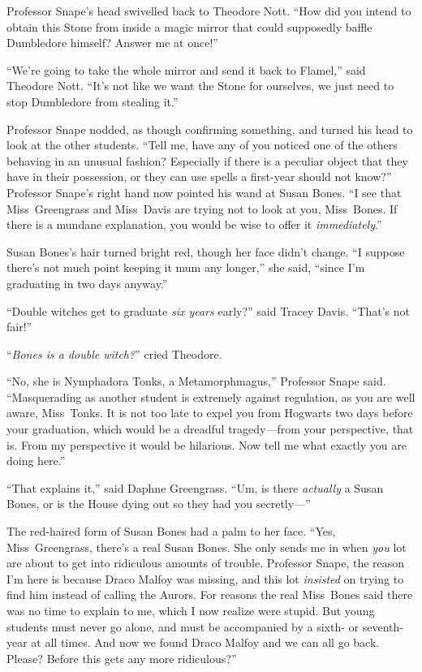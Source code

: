 Professor Snape’s head swivelled back to Theodore Nott. “How did you intend to obtain this Stone from inside a magic mirror that could supposedly baffle Dumbledore himself? Answer me at once!”

“We’re going to take the whole mirror and send it back to Flamel,” said Theodore Nott. “It’s not like we want the Stone for ourselves, we just need to stop Dumbledore from stealing it.”

Professor Snape nodded, as though confirming something, and turned his head to look at the other students. “Tell me, have any of you noticed one of the others behaving in an unusual fashion? Especially if there is a peculiar object that they have in their possession, or they can use spells a first-year should not know?” Professor Snape’s right hand now pointed his wand at Susan Bones. “I see that Miss~Greengrass and Miss~Davis are trying not to look at you, Miss~Bones. If there is a mundane explanation, you would be wise to offer it \emph{immediately}.”

Susan Bones’s hair turned bright red, though her face didn’t change. “I suppose there’s not much point keeping it mum any longer,” she said, “since I’m graduating in two days anyway.”

“Double witches get to graduate \emph{six years} early?” said Tracey Davis. “That’s not fair!”

“\emph{Bones is a double witch?}” cried Theodore.

“No, she is Nymphadora Tonks, a Metamorphmagus,” Professor Snape said. “Masquerading as another student is extremely against regulation, as you are well aware, Miss~Tonks. It is not too late to expel you from Hogwarts two days before your graduation, which would be a dreadful tragedy—from your perspective, that is. From my perspective it would be hilarious. Now tell me what exactly you are doing here.”

“That explains it,” said Daphne Greengrass. “Um, is there \emph{actually} a Susan Bones, or is the House dying out so they had you secretly—”

The red-haired form of Susan Bones had a palm to her face. “Yes, Miss~Greengrass, there’s a real Susan Bones. She only sends me in when \emph{you} lot are about to get into ridiculous amounts of trouble. Professor Snape, the reason I’m here is because Draco Malfoy was missing, and this lot \emph{insisted} on trying to find him instead of calling the Aurors. For reasons the real Miss~Bones said there was no time to explain to me, which I now realize were stupid. But young students must never go alone, and must be accompanied by a sixth- or seventh-year at all times. And now we found Draco Malfoy and we can all go back. Please? Before this gets any more ridiculous?”

